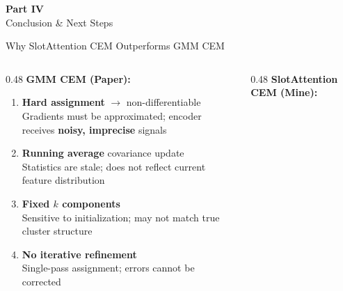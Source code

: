 \documentclass[aspectratio=169, 10pt]{beamer}
\newcommand{\fix}[1]{\textcolor{goodgreen}{\textbf{#1}}}
\newcommand{\bad}[1]{\textcolor{bugred}{#1}}
\begin{document}

\begin{frame}{}
\vfill
\begin{center}
{\Huge\textbf{Part IV}}\\[0.3cm]
{\Large Conclusion \& Next Steps}
\end{center}
\vfill
\end{frame}

\begin{frame}{Why SlotAttention CEM Outperforms GMM CEM}

\vspace{-0.15cm}
\begin{columns}[T]
\begin{column}{0.48\textwidth}
\textbf{\bad{GMM CEM (Paper):}}

\vspace{0.05cm}
\small
\begin{enumerate}\setlength{\itemsep}{2pt}
    \item \textbf{Hard assignment} $\to$ non-differentiable\\
    Gradients must be approximated; encoder receives \textbf{noisy, imprecise} signals
    \item \textbf{Running average} covariance update\\
    Statistics are stale; does not reflect current feature distribution
    \item \textbf{Fixed $k$ components}\\
    Sensitive to initialization; may not match true cluster structure
    \item \textbf{No iterative refinement}\\
    Single-pass assignment; errors cannot be corrected
\end{enumerate}
\end{column}
\begin{column}{0.48\textwidth}
\textbf{\fix{SlotAttention CEM (Mine):}}


\end{column}
\end{columns}
\end{frame}
\end{document}
